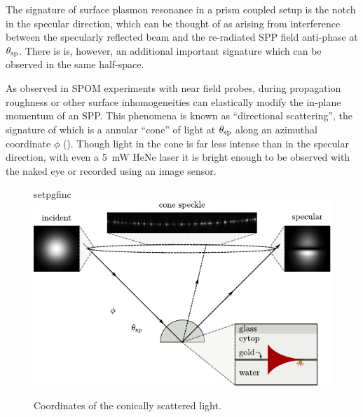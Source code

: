 The signature of surface plasmon resonance in a prism coupled setup is the
notch in the specular direction, which can be thought of as arising from
interference between the specularly reflected beam and the re-radiated SPP
field anti-phase at $\theta_\mathrm{sp}$.  There is is, however, an additional
important signature which can be observed in the same half-space.

As observed in SPOM experiments with near field probes, during propagation
roughness or other surface inhomogeneities can elastically modify the
in-plane momentum of an SPP\@.  This phenomena is known as ``directional
scattering'', the signature of which is a annular ``cone'' of light at
$\theta_\mathrm{sp}$ along an azimuthal coordinate $\phi$ ().
Though light in the cone is far less intense than in the specular
direction, with even a \SI{5}{\milli\watt} HeNe laser it is bright enough
to be observed with the naked eye or recorded using an image sensor.
\begin{figure}[ht]
 \centering
 {setpgfinc}
 \includegraphics{existence/figures/conefig}
 \caption{Coordinates of the conically scattered light.}
\label{fig:conefig}
\end{figure}

